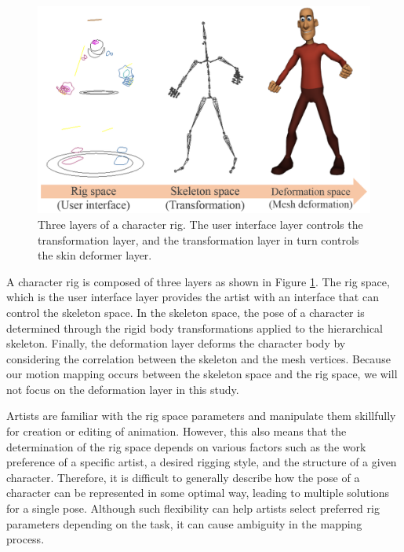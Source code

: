 \begin{figure}[ht]
  \centering
  \includegraphics[width=1.0\linewidth]{images/rigLayer}
  \caption{Three layers of a character rig. The user interface layer controls the transformation layer, and the transformation layer in turn controls the skin deformer layer.}
  \label{fig:rigLayer}
\end{figure}

A character rig is composed of three layers\cite{orvalho2012facial} as shown in Figure \ref{fig:rigLayer}. The rig space, which is the user interface layer provides the artist with an interface that can control the skeleton space. In the skeleton space, the pose of a character is determined through the rigid body transformations applied to the hierarchical skeleton. Finally, the deformation layer deforms the character body by considering the correlation between the skeleton and the mesh vertices. Because our motion mapping occurs between the skeleton space and the rig space, we will not focus on the deformation layer in this study.

Artists are familiar with the rig space parameters and manipulate them skillfully for creation or editing of animation. However, this also means that the determination of the rig space depends on various factors such as the work preference of a specific artist, a desired rigging style, and the structure of a given character. Therefore, it is difficult to generally describe how the pose of a character can be represented in some optimal way, leading to multiple solutions for a single pose. Although such flexibility can help artists select preferred rig parameters depending on the task, it can cause ambiguity in the mapping process. 

